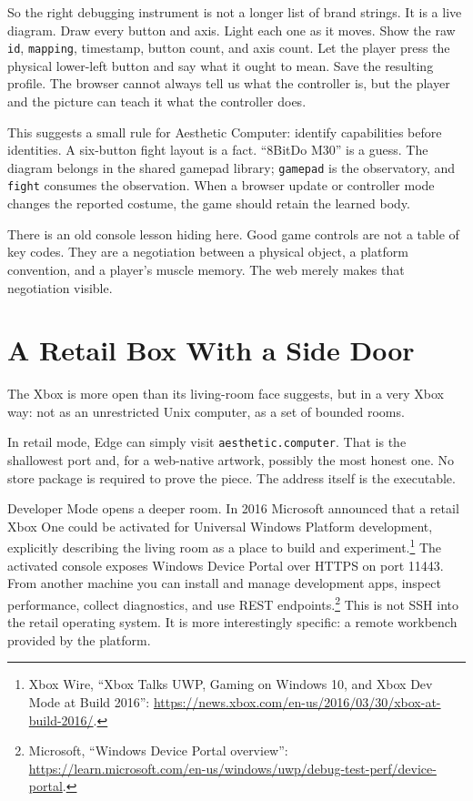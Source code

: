 \documentclass[11pt,letterpaper]{article}
\begin{document}
So the right debugging instrument is not a longer list of brand strings. It is a live diagram. Draw every button and axis. Light each one as it moves. Show the raw \texttt{id}, \texttt{mapping}, timestamp, button count, and axis count. Let the player press the physical lower-left button and say what it ought to mean. Save the resulting profile. The browser cannot always tell us what the controller is, but the player and the picture can teach it what the controller does.

This suggests a small rule for Aesthetic Computer: identify capabilities before identities. A six-button fight layout is a fact. ``8BitDo M30'' is a guess. The diagram belongs in the shared gamepad library; \texttt{gamepad} is the observatory, and \texttt{fight} consumes the observation. When a browser update or controller mode changes the reported costume, the game should retain the learned body.

There is an old console lesson hiding here. Good game controls are not a table of key codes. They are a negotiation between a physical object, a platform convention, and a player's muscle memory. The web merely makes that negotiation visible.

\section{A Retail Box With a Side Door}

The Xbox is more open than its living-room face suggests, but in a very Xbox way: not as an unrestricted Unix computer, as a set of bounded rooms.

In retail mode, Edge can simply visit \texttt{aesthetic.computer}. That is the shallowest port and, for a web-native artwork, possibly the most honest one. No store package is required to prove the piece. The address itself is the executable.

Developer Mode opens a deeper room. In 2016 Microsoft announced that a retail Xbox One could be activated for Universal Windows Platform development, explicitly describing the living room as a place to build and experiment.\footnote{Xbox Wire, ``Xbox Talks UWP, Gaming on Windows 10, and Xbox Dev Mode at Build 2016'': \url{https://news.xbox.com/en-us/2016/03/30/xbox-at-build-2016/}.} The activated console exposes Windows Device Portal over HTTPS on port 11443. From another machine you can install and manage development apps, inspect performance, collect diagnostics, and use REST endpoints.\footnote{Microsoft, ``Windows Device Portal overview'': \url{https://learn.microsoft.com/en-us/windows/uwp/debug-test-perf/device-portal}.} This is not SSH into the retail operating system. It is more interestingly specific: a remote workbench provided by the platform.
\end{document}
